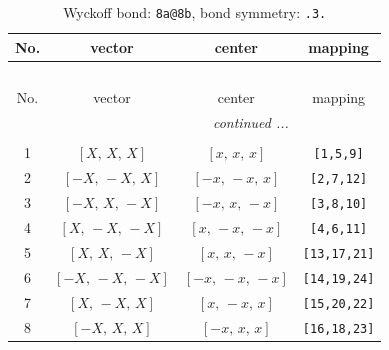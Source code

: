 \documentclass[fleqn,8pt]{jsarticle}
\begin{document}
\begin{longtable}{cccc}
\caption{Wyckoff bond: {\tt 8a@8b}, bond symmetry: {\tt .3.}}
 \\
 \hline \hline
No. & vector & center & mapping \\ \hline \endfirsthead

\multicolumn{3}{l}{\tablename\ \thetable{}} \\
 \hline \hline
No. & vector & center & mapping \\ \hline \endhead

 \hline \hline
\multicolumn{3}{r}{\footnotesize\it continued ...} \\ \endfoot

 \hline \hline
\multicolumn{3}{r}{} \\ \endlastfoot

1 & $\left[ X,\, X,\, X \right]$ & $\left[ x,\, x,\, x \right]$ & {\tt [1,5,9]} \\ \hline
2 & $\left[ - X,\, - X,\, X \right]$ & $\left[ - x,\, - x,\, x \right]$ & {\tt [2,7,12]} \\ \hline
3 & $\left[ - X,\, X,\, - X \right]$ & $\left[ - x,\, x,\, - x \right]$ & {\tt [3,8,10]} \\ \hline
4 & $\left[ X,\, - X,\, - X \right]$ & $\left[ x,\, - x,\, - x \right]$ & {\tt [4,6,11]} \\ \hline
5 & $\left[ X,\, X,\, - X \right]$ & $\left[ x,\, x,\, - x \right]$ & {\tt [13,17,21]} \\ \hline
6 & $\left[ - X,\, - X,\, - X \right]$ & $\left[ - x,\, - x,\, - x \right]$ & {\tt [14,19,24]} \\ \hline
7 & $\left[ X,\, - X,\, X \right]$ & $\left[ x,\, - x,\, x \right]$ & {\tt [15,20,22]} \\ \hline
8 & $\left[ - X,\, X,\, X \right]$ & $\left[ - x,\, x,\, x \right]$ & {\tt [16,18,23]} \\
\end{longtable}
\renewcommand{\arraystretch}{1.2}
\end{document}

